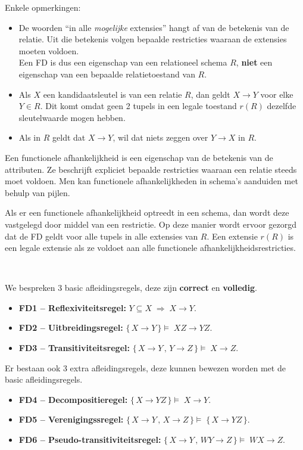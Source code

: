 \newpage
\noindent Enkele opmerkingen:
\begin{itemize}
\item De woorden ``in alle \textit{mogelijke} extensies'' hangt af van de betekenis van de relatie. Uit die betekenis volgen bepaalde restricties waaraan de extensies moeten voldoen.\\
Een FD is dus een eigenschap van een relationeel schema $R$, \textbf{niet} een eigenschap van een bepaalde relatietoestand van $R$.
\item Als $X$ een kandidaatsleutel is van een relatie $R$, dan geldt $X \rightarrow Y$ voor elke $Y \in R$. Dit komt omdat geen 2 tupels in een legale toestand $r(R)$ dezelfde sleutelwaarde mogen hebben.
\item Als in $R$ geldt dat $X \rightarrow Y$, wil dat niets zeggen over $Y \rightarrow X$ in $R$.
\end{itemize}
Een functionele afhankelijkheid is een eigenschap van de betekenis van de attributen. Ze beschrijft expliciet bepaalde restricties waaraan een relatie steeds moet voldoen. Men kan functionele afhankelijkheden in schema's aanduiden met behulp van pijlen.

Als er een functionele afhankelijkheid optreedt in een schema, dan wordt deze vastgelegd door middel van een restrictie. Op deze manier wordt ervoor gezorgd dat de FD geldt voor alle tupels in alle extensies van $R$. Een extensie $r(R)$ is een legale extensie als ze voldoet aan alle functionele afhankelijkheidsrestricties.

~

\noindent We bespreken 3 basic afleidingsregels, deze zijn \textbf{correct} en \textbf{volledig}.
\begin{itemize}
\item \textbf{FD1 -- Reflexiviteitsregel:} $Y \subseteq X \;\Rightarrow\; X \rightarrow Y$.
\item \textbf{FD2 -- Uitbreidingsregel:} $\{\, X \rightarrow Y \,\} \models\; XZ \rightarrow YZ$.
\item \textbf{FD3 -- Transitiviteitsregel:} $\{\, X \rightarrow Y \,,\, Y \rightarrow Z \,\} \models\; X \rightarrow Z$.
\end{itemize}

\noindent Er bestaan ook 3 extra afleidingsregels, deze kunnen bewezen worden met de basic afleidingsregels.
\begin{itemize}
\item \textbf{FD4 -- Decompositieregel:} $\{\, X \rightarrow YZ \,\} \models\; X \rightarrow Y$.
\item \textbf{FD5 -- Verenigingssregel:} $\{\, X \rightarrow Y \,,\, X \rightarrow Z \,\} \models\; \{\, X \rightarrow YZ \,\}$.
\item \textbf{FD6 -- Pseudo-transitiviteitsregel:} $\{\, X \rightarrow Y \,,\, WY \rightarrow Z \,\} \models\; WX \rightarrow Z$.
\end{itemize}

